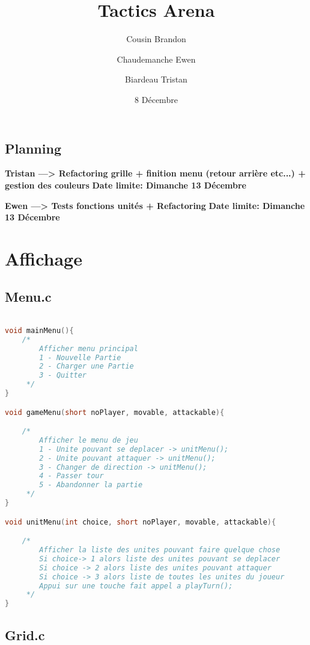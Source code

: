 \documentclass[a4paper,10pt]{extreport}
\begin{document}
\title{Tactics Arena}
\author{Cousin Brandon \and Chaudemanche Ewen \and Biardeau Tristan}
\date{8 Décembre} 

\maketitle
\chapter{Planning}

\textbf{Tristan ---> Refactoring grille + finition menu (retour arrière etc...) + gestion des couleurs}
\smallbreak
\textbf{Date limite: Dimanche 13 Décembre}

\bigbreak
\textbf{Ewen ---> Tests fonctions unités + Refactoring}
\smallbreak
\textbf{Date limite: Dimanche 13 Décembre}

\part{Affichage}

\chapter{Menu.c}
\vspace{-1cm}

\begin{lstlisting}[language=c]

void mainMenu(){
	/*
		Afficher menu principal
		1 - Nouvelle Partie
		2 - Charger une Partie
		3 - Quitter
	 */
}

void gameMenu(short noPlayer, movable, attackable){

	/*
		Afficher le menu de jeu
		1 - Unite pouvant se deplacer -> unitMenu();
		2 - Unite pouvant attaquer -> unitMenu();
		3 - Changer de direction -> unitMenu();
		4 - Passer tour
		5 - Abandonner la partie
	 */
}

void unitMenu(int choice, short noPlayer, movable, attackable){

	/*
		Afficher la liste des unites pouvant faire quelque chose
		Si choice-> 1 alors liste des unites pouvant se deplacer
		Si choice -> 2 alors liste des unites pouvant attaquer
		Si choice -> 3 alors liste de toutes les unites du joueur
		Appui sur une touche fait appel a playTurn();
	 */
}
\end{lstlisting}

\chapter{Grid.c}
\vspace{-1cm}
\end{document}
